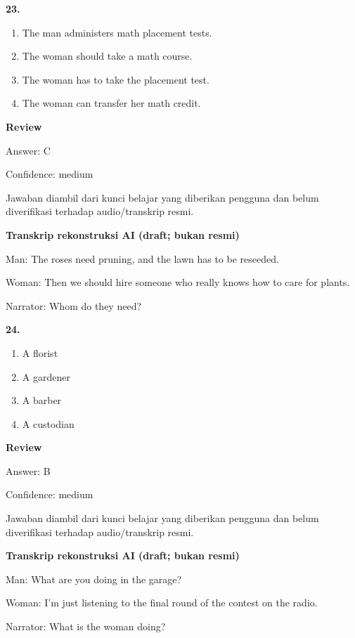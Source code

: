 \documentclass[12pt]{article}
\begin{document}
\noindent\textbf{23.}
\begin{enumerate}[label=(\Alph*),leftmargin=*,itemsep=0.2em]
\item The man administers math placement tests.
\item The woman should take a math course.
\item The woman has to take the placement test.
\item The woman can transfer her math credit.
\end{enumerate}
\par
\begingroup
\setlength{\parskip}{0pt}
\setlength{\parindent}{0pt}
\textbf{Review}\par
Answer: C\par
Confidence: medium\par
Jawaban diambil dari kunci belajar yang diberikan pengguna dan belum diverifikasi terhadap audio/transkrip resmi.\par
\endgroup
\par
\vspace{0.25\baselineskip}
\begin{exampleblock}
\textbf{Transkrip rekonstruksi AI (draft; bukan resmi)}\par
Man: The roses need pruning, and the lawn has to be reseeded.\par
Woman: Then we should hire someone who really knows how to care for plants.\par
Narrator: Whom do they need?\par
\end{exampleblock}
\noindent\textbf{24.}
\begin{enumerate}[label=(\Alph*),leftmargin=*,itemsep=0.2em]
\item A florist
\item A gardener
\item A barber
\item A custodian
\end{enumerate}
\par
\begingroup
\setlength{\parskip}{0pt}
\setlength{\parindent}{0pt}
\textbf{Review}\par
Answer: B\par
Confidence: medium\par
Jawaban diambil dari kunci belajar yang diberikan pengguna dan belum diverifikasi terhadap audio/transkrip resmi.\par
\endgroup
\par
\vspace{0.25\baselineskip}
\begin{exampleblock}
\textbf{Transkrip rekonstruksi AI (draft; bukan resmi)}\par
Man: What are you doing in the garage?\par
Woman: I'm just listening to the final round of the contest on the radio.\par
Narrator: What is the woman doing?\par
\end{exampleblock}
\end{document}
